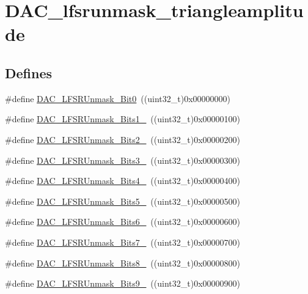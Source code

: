 \hypertarget{group__DAC__lfsrunmask__triangleamplitude}{
\section{DAC\_\-lfsrunmask\_\-triangleamplitude}
\label{group__DAC__lfsrunmask__triangleamplitude}
}
\subsection*{Defines}
\begin{DoxyCompactItemize}
\item 
\#define \hyperlink{group__DAC__lfsrunmask__triangleamplitude_ga60794fd5092a332cfa82e1cee13945fc}{DAC\_\-LFSRUnmask\_\-Bit0}~((uint32\_\-t)0x00000000)
\item 
\#define \hyperlink{group__DAC__lfsrunmask__triangleamplitude_ga09f47cfa563252a1add4662284350c07}{DAC\_\-LFSRUnmask\_\-Bits1\_}~((uint32\_\-t)0x00000100)
\item 
\#define \hyperlink{group__DAC__lfsrunmask__triangleamplitude_ga60b800857b7e33d9c0be2846fc56849f}{DAC\_\-LFSRUnmask\_\-Bits2\_}~((uint32\_\-t)0x00000200)
\item 
\#define \hyperlink{group__DAC__lfsrunmask__triangleamplitude_gafe219362b3a48d8678a65ef38cb45532}{DAC\_\-LFSRUnmask\_\-Bits3\_}~((uint32\_\-t)0x00000300)
\item 
\#define \hyperlink{group__DAC__lfsrunmask__triangleamplitude_ga2543d802e19d592a26c8231be663cdac}{DAC\_\-LFSRUnmask\_\-Bits4\_}~((uint32\_\-t)0x00000400)
\item 
\#define \hyperlink{group__DAC__lfsrunmask__triangleamplitude_ga71a01660d410823bfe76a603080dc125}{DAC\_\-LFSRUnmask\_\-Bits5\_}~((uint32\_\-t)0x00000500)
\item 
\#define \hyperlink{group__DAC__lfsrunmask__triangleamplitude_ga48fe2d3f4274d6bf28e446ca0001ed5d}{DAC\_\-LFSRUnmask\_\-Bits6\_}~((uint32\_\-t)0x00000600)
\item 
\#define \hyperlink{group__DAC__lfsrunmask__triangleamplitude_gaf0a93c1ee1e13776fae7558b36243431}{DAC\_\-LFSRUnmask\_\-Bits7\_}~((uint32\_\-t)0x00000700)
\item 
\#define \hyperlink{group__DAC__lfsrunmask__triangleamplitude_ga4f56965841d9d91ca5b6de43ee589598}{DAC\_\-LFSRUnmask\_\-Bits8\_}~((uint32\_\-t)0x00000800)
\item 
\#define \hyperlink{group__DAC__lfsrunmask__triangleamplitude_gaf7f4540d9ec6efe074e1e4485f9a347a}{DAC\_\-LFSRUnmask\_\-Bits9\_}~((uint32\_\-t)0x00000900)

\end{DoxyCompactItemize}
